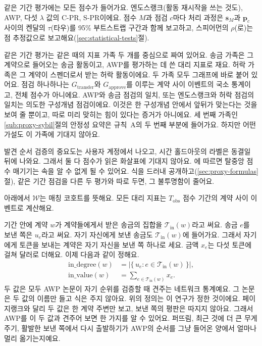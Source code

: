 
같은 기간 평가에는 모든 점수가 들어가요. 엔도스랭크(활동 재시작을 쓰는 것도), AWP, 다섯 $\lambda$ 값의 \mbox{C-PR}, \mbox{S-PR}이에요. 점수 $M$과 점검 $c$마다 처리 과정은 $\mathbf{s}_M$과 $\mathbf{p}_c$ 사이의 켄달의 $\tau$(타우)를 95\% 부트스트랩 구간과 함께 보고하고, 스피어먼의 $\rho$(로)는 점 추정값으로 보고해요(\ref{sec:statistical-tests}절).

같은 기간 평가는 같은 때의 지표 가족 두 개를 중심으로 짜여 있어요. 송금 가족은 그 계약으로 들어오는 송금 활동이고, AWP를 평가하는 데 쓴 대리 지표로 재요\parencite{do2023awp}. 허락 가족은 그 계약이 스펜더로서 받는 허락 활동이에요. 두 가족 모두 그래프에 바로 붙어 있어요. 점검 하나하나는 $G_{\text{transfer}}$와 $G_{\text{approve}}$를 이루는 계약 사이 이벤트의 국소 통계이고, 전체 점수가 아니에요. AWP와 송금 점검의 일치, 또는 엔도스랭크와 허락 점검의 일치는 의도한 구성개념 점검이에요. 이것은 한 구성개념 안에서 앞뒤가 맞는다는 것을 보여 줄 뿐이고, 따로 미리 맞히는 힘이 있다는 증거가 아니에요. 세 번째 가족인 \ref{sub:proxy-sybil}절의 안정성 요약은 규칙~A의 두 번째 부분에 들어가요. 하지만 어떤 가설도 이 가족에 기대지 않아요.

발견 순서 검증의 중요도는 사용자 계정에서 나오고, 시간 홀드아웃의 라벨은 동결일 뒤에 나와요. 그래서 둘 다 점수가 읽은 화살표에 기대지 않아요. \textcite{packin2024credit}에 따르면 탈중앙 점수 매기기는 속을 알 수 없게 될 수 있어요. 식을 드러내 공개하고(\ref{sec:proxy-formulas}절), 같은 기간 점검을 다른 두 평가와 따로 두면, 그 불투명함이 줄어요.


아래에서 $\mathcal{W}$는 매칭 코호트를 뜻해요. 모든 대리 지표는 $T_{\mathrm{obs}}$ 점수 기간의 계약 사이 이벤트로 계산해요.


기간 안에 계약 $w$가 계약들에게서 받은 송금의 집합을 $\mathcal{T}_{\mathrm{in}}(w)$라고 써요. 송금 $e$를 보낸 쪽은 $u_e$라고 써요. 자기 자신에게 보낸 송금도 $\mathcal{T}_{\mathrm{in}}(w)$에 들어가요. 그래서 자기에게 토큰을 보내는 계약은 자기 자신을 보낸 쪽 하나로 세요. 금액 $x_e$는 다섯 토큰에 걸쳐 달러로 더해요. 이제 다음과 같이 정해요.
\begin{align}
\mathrm{in\_degree}(w)
&=
\bigl|\{\,u_e : e\in\mathcal{T}_{\mathrm{in}}(w)\,\}\bigr|,
\label{eq:in-degree}\\
\mathrm{in\_value}(w)
&=
\sum_{e\in\mathcal{T}_{\mathrm{in}}(w)} x_e.
\label{eq:in-value}
\end{align}
두 값은 모두 AWP 논문이 자기 순위를 검증할 때 견주는 네트워크 통계예요\parencite{do2023awp}. 그 논문은 두 값의 이름만 들고 식은 주지 않아요. 위의 정의는 이 연구가 정한 것이에요. 페이지랭크와 달리 두 값은 한 계약 주변만 보고, 보낸 쪽의 평판은 따지지 않아요. 그래서 AWP를 이 두 값과 견주어 보면 한 가지를 알 수 있어요. 퍼뜨림, 최근 것에 더 큰 무게 주기, 활발한 보낸 쪽에서 다시 출발하기가 AWP의 순서를 그냥 들어온 양에서 얼마나 멀리 옮기는지예요.

